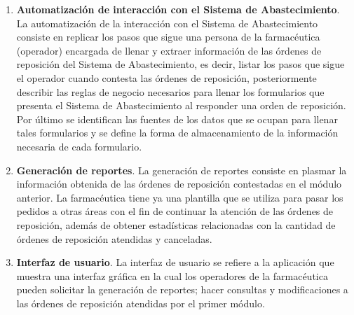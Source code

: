 \documentclass[letterpaper,11pt]{article}
\begin{document}
\begin{enumerate}
\item \textbf{Automatización de interacción con el Sistema de Abastecimiento}. La automatización de la interacción con el Sistema de Abastecimiento consiste en replicar los pasos que sigue una persona de la farmacéutica (operador) encargada de llenar y extraer información de las órdenes de reposición del Sistema de Abastecimiento, es decir, listar los pasos que sigue el operador cuando contesta las órdenes de reposición, posteriormente describir las reglas de negocio necesarios para llenar los formularios que presenta el Sistema de Abastecimiento al responder una orden de reposición. Por último se identifican las fuentes de los datos que se ocupan para llenar tales formularios y se define la forma de almacenamiento de la información necesaria de cada formulario.
\item \textbf{Generación de reportes}. La generación de reportes consiste en plasmar la información obtenida de las órdenes de reposición contestadas en el módulo anterior. La farmacéutica tiene ya una plantilla que se utiliza para pasar los pedidos a otras áreas con el fin de continuar la atención de las órdenes de reposición, además de obtener estadísticas relacionadas con la cantidad de órdenes de reposición atendidas y canceladas.
\item \textbf{Interfaz de usuario}. La interfaz de usuario se refiere a la aplicación que muestra una interfaz gráfica en la cual los operadores de la farmacéutica pueden solicitar la generación de reportes; hacer consultas y modificaciones a las órdenes de reposición atendidas por el primer módulo.
\end{enumerate}
\end{document}

